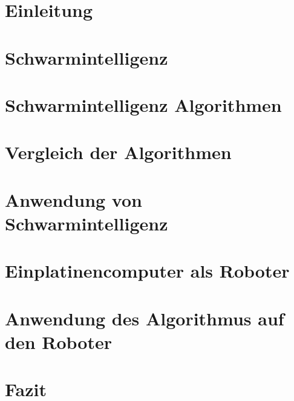 \documentclass[12pt, a4paper]{report}
\begin{document}



\tableofcontents
\listoffigures
\listoftables
\listoflistings
{}

\chapter{Einleitung}

\chapter{Schwarmintelligenz}

\chapter{Schwarmintelligenz Algorithmen}
\label{ch:algo}

\chapter{Vergleich der Algorithmen}

\chapter{Anwendung von Schwarmintelligenz}
\label{ch:anwendungAlgo}

\chapter{Einplatinencomputer als Roboter}
\label{ch:einplatinen}

\chapter{Anwendung des Algorithmus auf den Roboter}

\chapter{Fazit}


\printbibliography
\end{document}
